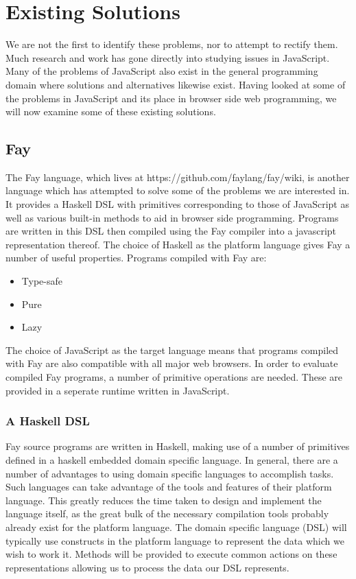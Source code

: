 
\section{Existing Solutions}
We are not the first to identify these problems, nor to attempt
to rectify them. Much research and work has gone directly into studying
issues in JavaScript. Many of the problems of JavaScript also exist
in the general programming domain where solutions and alternatives
likewise exist. Having looked at some of the problems in JavaScript 
and its place in browser side web programming, we will now examine
some of these existing solutions.


\subsection{Fay}
The Fay language, which lives at https://github.com/faylang/fay/wiki, is
another language which has attempted to solve some of the problems we
are interested in. It provides a Haskell DSL with primitives corresponding
to those of JavaScript as well as various built-in methods to aid in browser
side programming. Programs are written in this DSL then compiled using the
Fay compiler into a javascript representation thereof. The choice of Haskell
as the platform language gives Fay a number of useful properties. Programs 
compiled with Fay are:

\begin{itemize}
	\item Type-safe
	\item Pure
	\item Lazy
\end{itemize}

\noindent The choice of JavaScript as the target language means that programs
compiled with Fay are also compatible with all major web browsers. In order
to evaluate compiled Fay programs, a number of primitive operations
are needed. These are provided in a seperate runtime written in JavaScript.

\subsubsection{A Haskell DSL}
Fay source programs are written in Haskell, making use of a number of
primitives defined in a haskell embedded domain specific language.
In general, there are a number of advantages to using domain specific languages
to accomplish tasks. Such languages can take advantage of the tools and 
features of their platform language. This greatly reduces the time taken to
design and implement the language itself, as the great bulk of the necessary
compilation tools probably already exist for the platform language. 
The domain specific language (DSL) will typically use constructs in the
platform language to represent the data which we wish to work it. Methods
will be provided to execute common actions on these representations allowing
us to process the data our DSL represents. 

